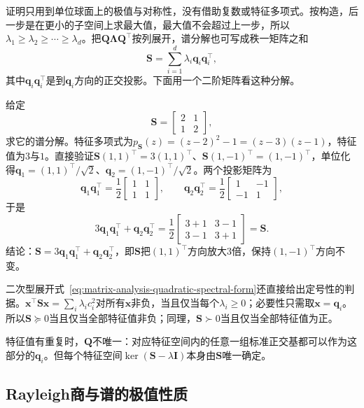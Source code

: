 证明只用到单位球面上的极值与对称性，没有借助复数或特征多项式。按构造，后一步是在更小的子空间上求最大值，最大值不会超过上一步，所以$\lambda_1\geq\lambda_2\geq\cdots\geq\lambda_d$。把$\bm Q\bm\Lambda\bm Q^\top$按列展开，谱分解也可写成秩一矩阵之和
\[
 \bm S=\sum_{i=1}^d\lambda_i\bm q_i\bm q_i^\top ,
\]
其中$\bm q_i\bm q_i^\top$是到$\bm q_i$方向的正交投影。下面用一个二阶矩阵看这种分解。
\begin{example}[二阶对称矩阵的谱分解]
\label{ex:ls-symmetric-spectral-two-by-two}
给定
\[
 \bm S=\begin{bmatrix}2&1\\1&2\end{bmatrix},
\]
求它的谱分解。特征多项式为$p_{\bm S}(z)=(z-2)^2-1=(z-3)(z-1)$，特征值为$3$与$1$。直接验证$\bm S(1,1)^\top=3(1,1)^\top$、$\bm S(1,-1)^\top=(1,-1)^\top$，单位化得$\bm q_1=(1,1)^\top/\sqrt2$、$\bm q_2=(1,-1)^\top/\sqrt2$。两个投影矩阵为
\[
 \bm q_1\bm q_1^\top=\frac12\begin{bmatrix}1&1\\1&1\end{bmatrix},\qquad
 \bm q_2\bm q_2^\top=\frac12\begin{bmatrix}1&-1\\-1&1\end{bmatrix},
\]
于是
\[
 3\bm q_1\bm q_1^\top+\bm q_2\bm q_2^\top
 =\frac12\begin{bmatrix}3+1&3-1\\3-1&3+1\end{bmatrix}=\bm S .
\]
结论：$\bm S=3\bm q_1\bm q_1^\top+\bm q_2\bm q_2^\top$，即$\bm S$把$(1,1)^\top$方向放大$3$倍，保持$(1,-1)^\top$方向不变。
\end{example}

二次型展开式~\eqref{eq:matrix-analysis-quadratic-spectral-form}还直接给出定号性的判据。$\bm x^\top\bm S\bm x=\sum_i\lambda_ic_i^2$对所有$\bm x$非负，当且仅当每个$\lambda_i\geq0$；必要性只需取$\bm x=\bm q_i$。所以$\bm S\succeq0$当且仅当全部特征值非负；同理，$\bm S\succ0$当且仅当全部特征值为正。

特征值有重复时，$\bm Q$不唯一：对应特征空间内的任意一组标准正交基都可以作为这部分的$\bm q_i$。但每个特征空间$\ker(\bm S-\lambda\bm I)$本身由$\bm S$唯一确定。

\subsection{Rayleigh商与谱的极值性质}
\label{sec:ls-rayleigh-extremal}
\label{sec:ls-sphere-existence}
\label{sec:linear-algebra-constrained-estimation}
\label{sec:ls-sphere-solve}

